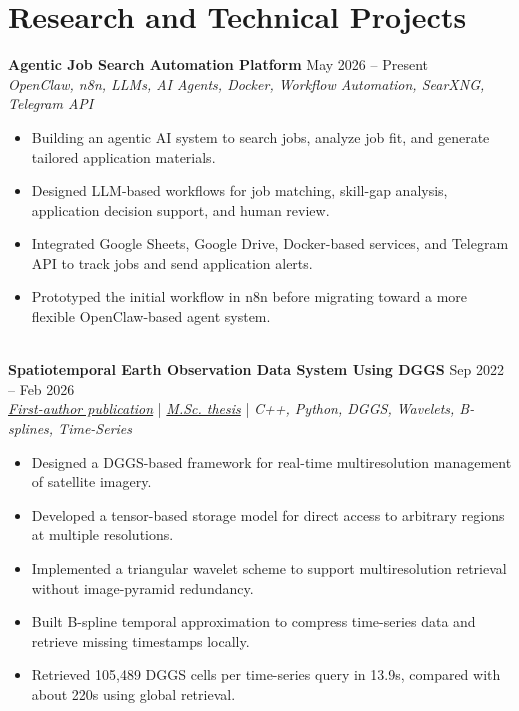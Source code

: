 \documentclass[a4paper,10pt]{article}
\begin{document}

\section*{Research and Technical Projects}

\noindent
\textbf{Agentic Job Search Automation Platform} \hfill May 2026 -- Present \\
\textit{OpenClaw, n8n, LLMs, AI Agents, Docker, Workflow Automation, SearXNG, Telegram API}
\begin{itemize}[leftmargin=0.25in]
    \item Building an agentic AI system to search jobs, analyze job fit, and generate tailored application materials.
    \item Designed LLM-based workflows for job matching, skill-gap analysis, application decision support, and human review.
    \item Integrated Google Sheets, Google Drive, Docker-based services, and Telegram API to track jobs and send application alerts.
    \item Prototyped the initial workflow in n8n before migrating toward a more flexible OpenClaw-based agent system.
\end{itemize}

\noindent \\
\textbf{Spatiotemporal Earth Observation Data System Using DGGS} \hfill Sep 2022 -- Feb 2026 \\
\textit{\href{https://doi.org/10.3390/rs17040570}{First-author publication}} | \textit{\href{https://ucalgary.scholaris.ca/items/114b394b-e516-4732-bd3a-45dd6160d480}{M.Sc. thesis}} | \textit{C++, Python, DGGS, Wavelets, B-splines, Time-Series}
\begin{itemize}[leftmargin=0.25in]
    \item Designed a DGGS-based framework for real-time multiresolution management of satellite imagery.
    \item Developed a tensor-based storage model for direct access to arbitrary regions at multiple resolutions.
    \item Implemented a triangular wavelet scheme to support multiresolution retrieval without image-pyramid redundancy.
    \item Built B-spline temporal approximation to compress time-series data and retrieve missing timestamps locally.
    \item Retrieved 105,489 DGGS cells per time-series query in 13.9s, compared with about 220s using global retrieval.
\end{itemize}
\end{document}
